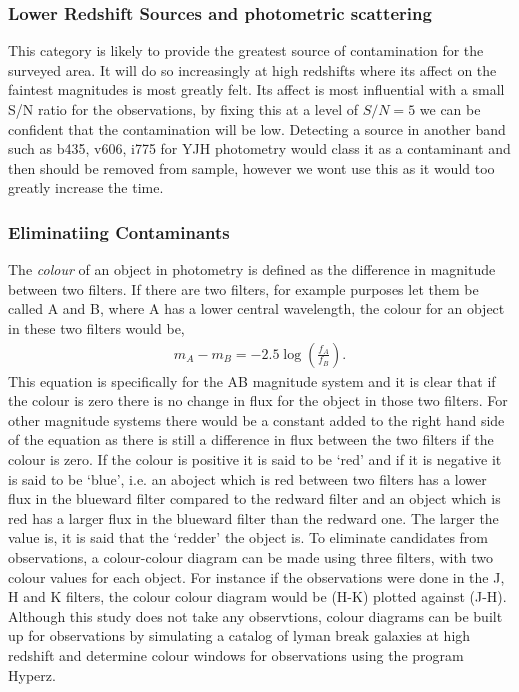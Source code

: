 		    \subsubsection*{Lower Redshift Sources and photometric scattering} %
		    \label{sub:lower_redshift_sources_and_photometric_scattering}
		        This category is likely to provide the greatest source of contamination for the surveyed area. It will do so increasingly at high redshifts where its affect on the faintest magnitudes is most greatly felt. Its affect is most influential with a small S/N ratio for the observations, by fixing this at a level of $S/N = 5$ we can be confident that the contamination will be low. Detecting a source in another band such as b435, v606, i775 for YJH photometry would class it as a contaminant and then should be removed from sample, however we wont use this as it would too greatly increase the time.

    	\subsubsection{Eliminatiing Contaminants} %
    	\label{sub:eliminatiing_contaminants}
			The \emph{colour} of an object in photometry is defined as the difference in magnitude between two filters. If there are two filters, for example purposes let them be called A and B, where A has a lower central wavelength, the colour for an object in these two filters would be,
			\begin{align}
				m_A-m_B=-2.5\log\left(\frac{f_A}{f_B}\right).
			\end{align}
			This equation is specifically for the AB magnitude system and it is clear that if the colour is zero there is no change in flux for the object in those two filters. For other magnitude systems there would be a constant added to the right hand side of the equation as there is still a difference in flux between the two filters if the colour is zero. If the colour is positive it is said to be `red' and if it is negative it is said to be `blue', i.e. an aboject which is red between two filters has a lower flux in the blueward filter compared to the redward filter and an object which is red has a larger flux in the blueward filter than the redward one.  The larger the value is, it is said that the `redder' the object is. To eliminate candidates from observations, a colour-colour diagram can be made using three filters, with two colour values for each object. For instance if the observations were done in the J, H and K filters, the colour colour diagram would be (H-K) plotted against (J-H). Although this study does not take any observtions, colour diagrams can be built up for observations by simulating a catalog of lyman break galaxies at high redshift and determine colour windows for observations using the program Hyperz.


